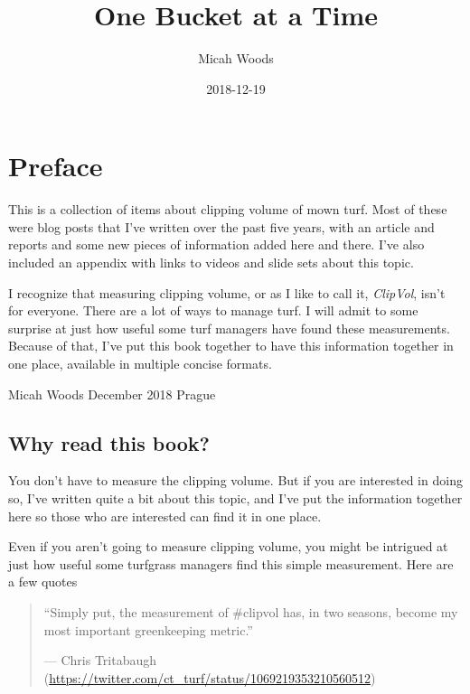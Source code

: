 \documentclass[12pt,b5,]{tufte-book}
\title{One Bucket at a Time}
\author{Micah Woods}
\date{2018-12-19}
\begin{document}
\maketitle



{
\setcounter{tocdepth}{1}
\tableofcontents
}

\hypertarget{preface}{%
\chapter*{Preface}\label{preface}}

This is a collection of items about clipping volume of mown turf. Most of these were blog posts that I've written over the past five years, with an article and reports and some new pieces of information added here and there. I've also included an appendix with links to videos and slide sets about this topic.

I recognize that measuring clipping volume, or as I like to call it, \emph{ClipVol}, isn't for everyone. There are a lot of ways to manage turf. I will admit to some surprise at just how useful some turf managers have found these measurements. Because of that, I've put this book together to have this information together in one place, available in multiple concise formats.

Micah Woods
December 2018
Prague

\hypertarget{why-read-this-book}{%
\section*{Why read this book?}\label{why-read-this-book}}

You don't have to measure the clipping volume. But if you are interested in doing so, I've written quite a bit about this topic, and I've put the information together here so those who are interested can find it in one place.

Even if you aren't going to measure clipping volume, you might be intrigued at just how useful some turfgrass managers find this simple measurement. Here are a few quotes

\begin{quote}
``Simply put, the measurement of \#clipvol has, in two seasons, become my most important greenkeeping metric.''

--- Chris Tritabaugh (\url{https://twitter.com/ct_turf/status/1069219353210560512})
\end{quote}
\end{document}
